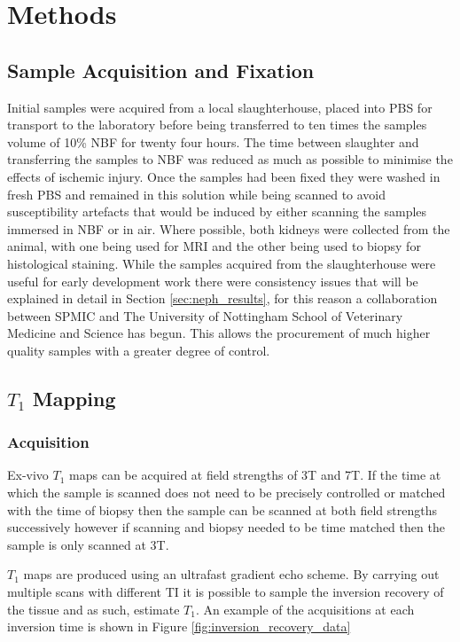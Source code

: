 \newpage
\section{Methods}
\label{sec:neph_methods}

\subsection{Sample Acquisition and Fixation}
\label{sec:fixation}
Initial samples were acquired from a local slaughterhouse, placed into \ac{PBS} for transport to the laboratory before being transferred to ten times the samples volume of 10\% \ac{NBF} for twenty four hours. The time between slaughter and transferring the samples to \ac{NBF} was reduced as much as possible to minimise the effects of ischemic injury. Once the samples had been fixed they were washed in fresh \ac{PBS} and remained in this solution while being scanned to avoid susceptibility artefacts that would be induced by either scanning the samples immersed in \ac{NBF} or in air. Where possible, both kidneys were collected from the animal, with one being used for \ac{MRI} and the other being used to biopsy for histological staining. While the samples acquired from the slaughterhouse were useful for early development work there were consistency issues that will be explained in detail in Section \ref{sec:neph_results}, for this reason a collaboration between \ac{SPMIC} and The University of Nottingham School of Veterinary Medicine and Science has begun. This allows the procurement of much higher quality samples with a greater degree of control. 

\subsection{$T_1$ Mapping}
\subsubsection{Acquisition}

Ex-vivo $T_1$ maps can be acquired at field strengths of 3T and 7T. If the time at which the sample is scanned does not need to be precisely controlled or matched with the time of biopsy then the sample can be scanned at both field strengths successively however if scanning and biopsy needed to be time matched then the sample is only scanned at 3T.

$T_1$ maps are produced using an ultrafast gradient echo scheme. By carrying out multiple scans with different \ac{TI} it is possible to sample the inversion recovery of the tissue and as such, estimate $T_1$. An example of the acquisitions at each inversion time is shown in Figure \ref{fig:inversion_recovery_data}

